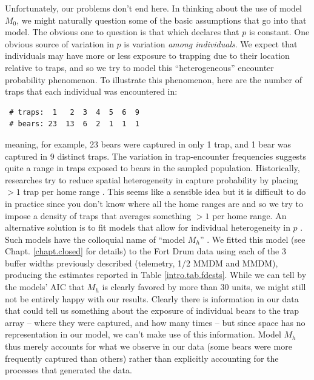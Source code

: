 Unfortunately, our problems don't end here. In thinking about the use
of model $M_0$, we might naturally question some of the basic
assumptions that go into that model. The obvious one to question is
that which declares that $p$ is constant. One obvious source of
variation in $p$ is variation {\it among individuals}. We expect that
individuals may have more or less exposure to trapping due to their
location relative to traps, and so we try to model this
``heterogeneous'' encounter probability phenomenon.
To illustrate
this phenomenon,  here are the
number of traps that each individual
was encountered in:
\begin{verbatim}
 # traps:  1   2  3  4  5  6  9
 # bears: 23  13  6  2  1  1  1
\end{verbatim}
meaning, for example, 23 bears were captured in only 1 trap, and 1
bear was captured in 9 distinct traps. The variation in trap-encounter
frequencies suggests quite a range in traps exposed to bears in the
sampled population.
Historically, researches try to reduce spatial heterogeneity in
capture probability by placing $>1$ trap per home range
\citep{otis_etal:1978, williams_etal:2002}. This seems like a sensible
idea but it is difficult to do in practice since you don't know where
all the home ranges are and so we try to impose a density of traps
that averages something $>1$ per home range.  An alternative solution
is to fit models that allow for individual heterogeneity in $p$
\citep{karanth:1995}. Such models have the colloquial name of ``model
$M_h$'' \citep{otis_etal:1978}.  We fitted this model (see
Chapt. \ref{chapt.closed} for details) to the Fort Drum data using
each of the 3 buffer widths previously described (telemetry, 1/2 MMDM
and MMDM), producing the estimates reported in Table
\ref{intro.tab.fdests}. While we can tell by the models' AIC that
$M_h$ is clearly favored by more than 30 units, we might still not be
entirely happy with our results. Clearly there is information in our
data that could tell us something about the exposure of individual
bears to the trap array -- where they were captured, and how many
times -- but since space has no representation in our model, we can't
make use of this information. Model $M_h$ thus merely accounts for
what we observe in our data (some bears were more frequently captured
than others) rather than explicitly accounting for the processes that
generated the data.

